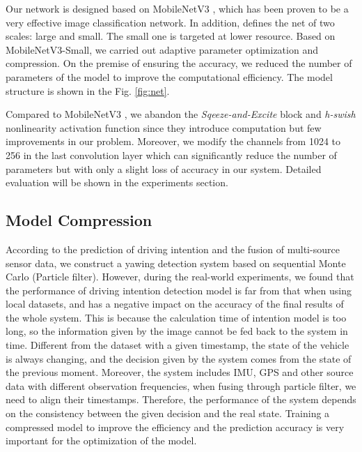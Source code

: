 \documentclass[journal]{IEEEtran}
\begin{document}

Our network is designed based on MobileNetV3 \cite{mobilenetv3}, which has been proven to be a very effective image classification network. 
In addition, \cite{mobilenetv3} defines the net of two scales: large and small. The small one is targeted at lower resource. Based on MobileNetV3-Small, we carried out adaptive parameter optimization and compression. On the premise of ensuring the accuracy, we reduced the number of parameters of the model to improve the computational efficiency. The model structure is shown in the Fig. \ref{fig:net}.

Compared to MobileNetV3 \cite{mobilenetv3}, we abandon the \textit{Sqeeze-and-Excite} \cite{hu2018squeeze} block and \textit{h-swish} nonlinearity activation function since they introduce computation but few improvements in our problem.  
Moreover, we modify the channels from 1024 to 256 in the last convolution layer which can significantly reduce the number of parameters but with only a slight loss of accuracy in our system. Detailed evaluation will be shown in the experiments section.
\subsection{Model Compression}\label{sec:pruning}
According to the prediction of driving intention and the fusion of multi-source sensor data, we construct a yawing detection system based on sequential Monte Carlo (Particle filter). However, during the real-world experiments, we found that the performance of driving intention detection model is far from that when using local datasets, and has a negative impact on the accuracy of the final results of the whole system. This is because the calculation time of intention model is too long, so the information given by the image cannot be fed back to the system in time. Different from the dataset with a given timestamp, the state of the vehicle is always changing, and the decision given by the system comes from the state of the previous moment. Moreover, the system includes IMU, GPS and other source data with different observation frequencies, when fusing through particle filter, we need to align their timestamps. Therefore, the performance of the system depends on the consistency between the given decision and the real state. Training a compressed model to improve the efficiency and the prediction accuracy is very important for the optimization of the model.
\end{document}
